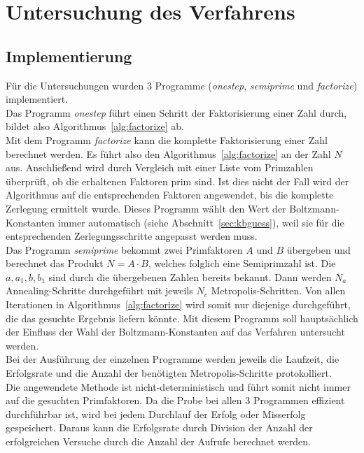 \chapter{Untersuchung des Verfahrens}\label{ch:results}

\section{Implementierung}
Für die Untersuchungen wurden $3$ Programme (\textit{onestep}, \textit{semiprime} und \textit{factorize}) implementiert.  \\
Das Programm \textit{onestep} führt einen Schritt der Faktorisierung einer Zahl durch, bildet also Algorithmus~\ref{alg:factorize} ab. \\
Mit dem Programm \textit{factorize} kann die komplette Faktorisierung einer Zahl berechnet werden. Es führt also den Algorithmus~\ref{alg:factorize} an der Zahl $N$ aus. Anschließend wird durch Vergleich mit einer Liste vom Primzahlen überprüft, ob die erhaltenen Faktoren prim sind. Ist dies nicht der Fall wird der Algorithmus auf die entsprechenden Faktoren angewendet, bis die komplette Zerlegung ermittelt wurde. Dieses Programm wählt den Wert der Boltzmann-Konstanten immer automatisch (siehe Abschnitt~\ref{sec:kbguess}), weil sie für die entsprechenden Zerlegungsschritte angepasst werden muss.\\
Das Programm \textit{semiprime} bekommt zwei Primfaktoren $A$ und $B$ übergeben und berechnet das Produkt $N=A\cdot B$, welches folglich eine Semiprimzahl ist. Die $a, a_1, b, b_1$ sind durch die übergebenen Zahlen bereits bekannt. Dann werden $N_a$ Annealing-Schritte durchgeführt mit jeweils $N_c$ Metropolis-Schritten. Von allen Iterationen in Algorithmus~\ref{alg:factorize} wird somit nur diejenige durchgeführt, die das gesuchte Ergebnis liefern könnte. Mit diesem Programm soll hauptsächlich der Einfluss der Wahl der Boltzmann-Konstanten auf das Verfahren untersucht werden. \\
Bei der Ausführung der einzelnen Programme werden jeweils die Laufzeit, die Erfolgsrate und die Anzahl der benötigten Metropolis-Schritte protokolliert. \\
Die angewendete Methode ist nicht-deterministisch und führt somit nicht immer auf die gesuchten Primfaktoren. Da die Probe bei allen $3$ Programmen effizient durchführbar ist, wird bei jedem Durchlauf der Erfolg oder Misserfolg gespeichert. Daraus kann die Erfolgsrate durch Division der Anzahl der erfolgreichen Versuche durch die Anzahl der Aufrufe berechnet werden. \\
